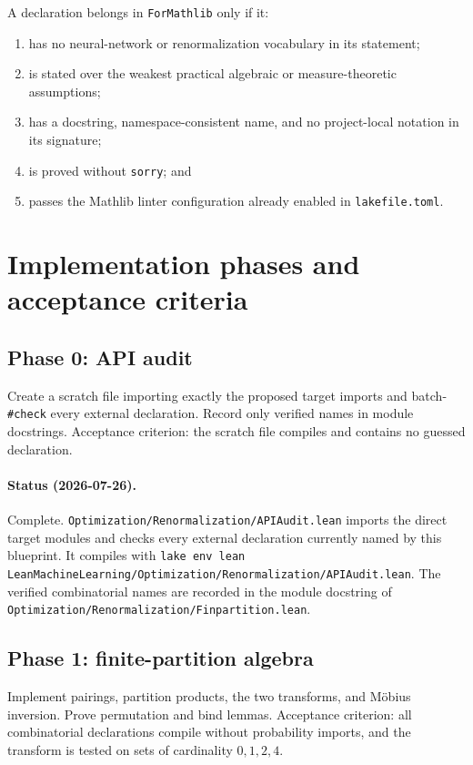 A declaration belongs in \texttt{ForMathlib} only if it:
\begin{enumerate}
  \item has no neural-network or renormalization vocabulary in its statement;
  \item is stated over the weakest practical algebraic or measure-theoretic assumptions;
  \item has a docstring, namespace-consistent name, and no project-local notation in its signature;
  \item is proved without \texttt{sorry}; and
  \item passes the Mathlib linter configuration already enabled in \texttt{lakefile.toml}.
\end{enumerate}

\section{Implementation phases and acceptance criteria}

\subsection*{Phase 0: API audit}
Create a scratch file importing exactly the proposed target imports and batch-\texttt{\#check} every
external declaration.  Record only verified names in module docstrings.  Acceptance criterion:
the scratch file compiles and contains no guessed declaration.

\paragraph{Status (2026-07-26).}
Complete.  \texttt{Optimization/Renormalization/APIAudit.lean} imports the direct target modules
and checks every external declaration currently named by this blueprint.  It compiles with
\texttt{lake env lean LeanMachineLearning/Optimization/Renormalization/APIAudit.lean}.  The verified combinatorial names are recorded
in the module docstring of \texttt{Optimization/Renormalization/Finpartition.lean}.

\subsection*{Phase 1: finite-partition algebra}
Implement pairings, partition products, the two transforms, and M\"obius inversion.  Prove
permutation and bind lemmas.  Acceptance criterion: all combinatorial declarations compile without
probability imports, and the transform is tested on sets of cardinality $0,1,2,4$.

